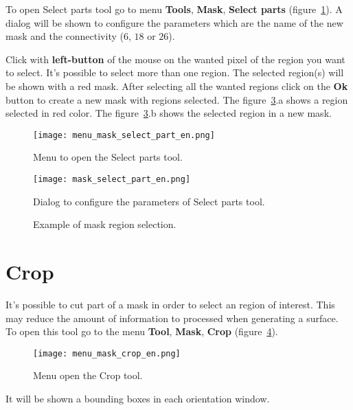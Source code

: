 To open Select parts tool go to menu \textbf{Tools}, \textbf{Mask}, \textbf{Select parts} (figure~\ref{fig:menu_mask_select_part}). A dialog will be shown to configure the parameters which are the name of the new mask and the connectivity ($6$, $18$ or $26$).

Click with \textbf{left-button} of the mouse on the wanted pixel of the region you want to select. It's possible to select more than one region. The selected region(s) will be shown with a red mask. After selecting all the wanted regions click on the \textbf{Ok} button to create a new mask with regions selected. The figure~\ref{fig:mask_selected_part}.a shows a region selected in red color. The figure~\ref{fig:mask_selected_part}.b shows the selected region in a new mask.


\begin{figure}[!htb]
\centering
\texttt{[image: menu\_mask\_select\_part\_en.png]}
\caption{Menu to open the Select parts tool.}
\label{fig:menu_mask_select_part}
\end{figure}

\begin{figure}[!htb]
\centering
\texttt{[image: mask\_select\_part\_en.png]}
\caption{Dialog to configure the parameters of Select parts tool.}
\label{fig:mask_select_part}
\end{figure}

\begin{figure}[!htb]
  \centering
    \qquad
  \hfill
  \caption{Example of mask region selection.}
  \label{fig:mask_selected_part}
\end{figure}

\section{Crop}

It's possible to cut part of a mask in order to select an region of interest. This may reduce the amount of information to processed when generating a surface. To open this tool go to the menu \textbf{Tool}, \textbf{Mask}, \textbf{Crop} (figure~\ref{fig:menu_mask_crop}).

\begin{figure}[!htb]
\centering
\texttt{[image: menu\_mask\_crop\_en.png]}
\caption{Menu open the Crop tool.}
\label{fig:menu_mask_crop}
\end{figure}

It will be shown a bounding boxes in each orientation window.
